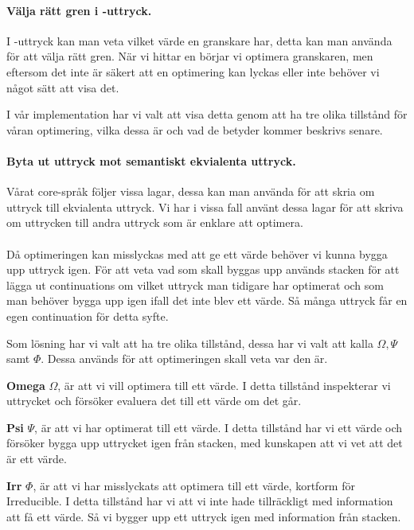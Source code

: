 \documentclass[Rapport]{subfiles}
\begin{document}
\paragraph{ Välja rätt gren i -uttryck. }

I -uttryck kan man veta vilket värde en granskare har, detta kan man använda
för att välja rätt gren. När vi hittar en  börjar vi optimera granskaren,
men eftersom det inte är säkert att en optimering kan lyckas eller inte behöver vi
något sätt att visa det. 

I vår implementation har vi valt att visa detta genom att ha tre olika tillstånd
för våran optimering, vilka dessa är och vad de betyder kommer beskrivs senare.

\paragraph{ Byta ut uttryck mot semantiskt ekvialenta uttryck.}

Vårat core-språk följer vissa lagar, dessa kan man använda för att skria om uttryck
till ekvialenta uttryck. Vi har i vissa fall använt dessa lagar för att skriva om
uttrycken till andra uttryck som är enklare att optimera.

\paragraph{}

Då optimeringen kan misslyckas med att ge ett värde behöver vi kunna bygga upp uttryck
igen. För att veta vad som skall byggas upp används stacken för att lägga ut continuations
om vilket uttryck man tidigare har optimerat och som man behöver bygga upp igen ifall det
inte blev ett värde. Så många uttryck får en egen continuation för detta syfte.

\stgOptimise

Som lösning har vi valt att ha tre olika tillstånd, dessa har vi valt att kalla
$\Omega, \Psi$ samt $\Phi$. Dessa används för att optimeringen skall veta var den
är.

\textbf{Omega} $\Omega$, är att vi vill optimera till ett värde. I detta tillstånd
inspekterar vi uttrycket och försöker evaluera det till ett värde om det går.

\textbf{Psi} $\Psi$, är att vi har optimerat till ett värde. I detta tillstånd
har vi ett värde och försöker bygga upp uttrycket igen från stacken, med kunskapen att vi vet
att det är ett värde.

\textbf{Irr} $\Phi$, är att vi har misslyckats att optimera till ett värde, kortform för Irreducible.
I detta tillstånd har vi att vi inte hade tillräckligt med information att få ett
värde. Så vi bygger upp ett uttryck igen med information från stacken.









\end{document}
